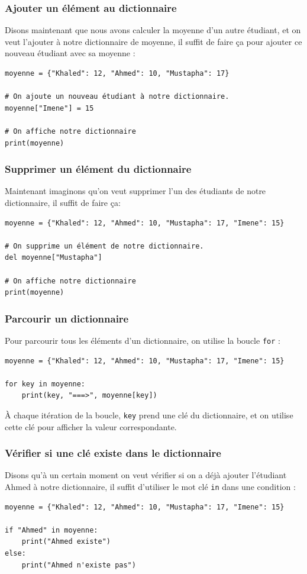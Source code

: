 \documentclass[12pt]{article}
\newcommand{\code}[1]{\colorbox{light-gray}{\texttt{#1}}}
\begin{document}
        \subsubsection{Ajouter un élément au dictionnaire}
            Disons maintenant que nous avons calculer la moyenne d'un autre étudiant, et on veut
            l'ajouter à notre dictionnaire de moyenne, il suffit de faire ça pour ajouter ce nouveau
            étudiant avec sa moyenne :
            \begin{lstlisting}[style=code]
moyenne = {"Khaled": 12, "Ahmed": 10, "Mustapha": 17}

# On ajoute un nouveau étudiant à notre dictionnaire.
moyenne["Imene"] = 15

# On affiche notre dictionnaire
print(moyenne)
            \end{lstlisting}

        \subsubsection{Supprimer un élément du dictionnaire}
            Maintenant imaginons qu'on veut supprimer l'un des étudiants de notre dictionnaire, il 
            suffit de faire ça:
            \begin{lstlisting}[style=code]
moyenne = {"Khaled": 12, "Ahmed": 10, "Mustapha": 17, "Imene": 15}

# On supprime un élément de notre dictionnaire.
del moyenne["Mustapha"]

# On affiche notre dictionnaire
print(moyenne)
            \end{lstlisting}

        \subsubsection{Parcourir un dictionnaire}
            Pour parcourir tous les éléments d'un dictionnaire, on utilise la boucle \code{for} :
            \begin{lstlisting}[style=code]
moyenne = {"Khaled": 12, "Ahmed": 10, "Mustapha": 17, "Imene": 15}

for key in moyenne:
    print(key, "===>", moyenne[key])
            \end{lstlisting}

            À chaque itération de la boucle, \code{key} prend une clé du dictionnaire, et on 
            utilise cette clé pour afficher la valeur correspondante.

        \subsubsection{Vérifier si une clé existe dans le dictionnaire}
            Disons qu'à un certain moment on veut vérifier si on a déjà ajouter l'étudiant Ahmed
            à notre dictionnaire, il suffit d'utiliser le mot clé \code{in} dans une condition :
            \begin{lstlisting}[style=code] 
moyenne = {"Khaled": 12, "Ahmed": 10, "Mustapha": 17, "Imene": 15}

if "Ahmed" in moyenne:
    print("Ahmed existe")
else:
    print("Ahmed n'existe pas")
            \end{lstlisting}
\end{document}
